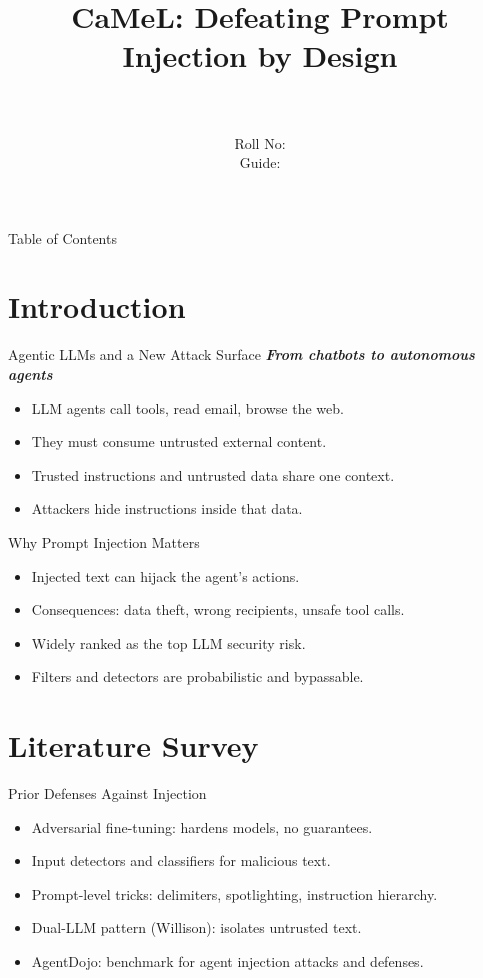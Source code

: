 \documentclass{beamer}
\title[\seminarShortTitle]{CaMeL: Defeating Prompt Injection by Design}
\author[\seminarName\ (\seminarShortCollege)]{\seminarName \\ \seminarRoll \\ Roll No: \seminarClassRoll \\ Guide: \seminarGuide}
\institute[\seminarShortCollege]{\seminarDept \\ \seminarCollege}
\date{\seminarDate}
\begin{document}
\begin{frame}\titlepage\end{frame}
\begin{frame}{Table of Contents}\tableofcontents\end{frame}
\section{Introduction}
\begin{frame}{Agentic LLMs and a New Attack Surface}
\textbf{\textit{From chatbots to autonomous agents}}
\begin{itemize}
\item LLM agents call tools, read email, browse the web.
\item They must consume untrusted external content.
\item Trusted instructions and untrusted data share one context.
\item Attackers hide instructions inside that data.
\end{itemize}
\end{frame}

\begin{frame}{Why Prompt Injection Matters}
\begin{itemize}
\item Injected text can hijack the agent's actions.
\item Consequences: data theft, wrong recipients, unsafe tool calls.
\item Widely ranked as the top LLM security risk.
\item Filters and detectors are probabilistic and bypassable.
\end{itemize}
\end{frame}

\section{Literature Survey}
\begin{frame}{Prior Defenses Against Injection}
\begin{itemize}
\item Adversarial fine-tuning: hardens models, no guarantees.
\item Input detectors and classifiers for malicious text.
\item Prompt-level tricks: delimiters, spotlighting, instruction hierarchy.
\item Dual-LLM pattern (Willison): isolates untrusted text.
\item AgentDojo: benchmark for agent injection attacks and defenses.
\end{itemize}
\end{frame}
\end{document}
